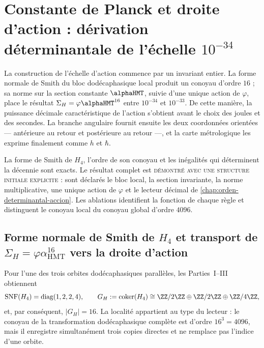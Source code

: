\section{Constante de Planck et droite d'action : dérivation déterminantale de l'échelle \texorpdfstring{\(10^{-34}\)}{décadique -34}}
\label{chap:escala-accion}

La construction de l'échelle d'action commence par un invariant entier. La
forme normale de Smith du bloc dodécaphasique local produit un conoyau
d'ordre \(16\) ; sa norme sur la section constante \(\alphaHMT\), suivie d'une
unique action de \(\varphi\), place le résultat
\(\Sigma_H=\varphi\alphaHMT^{16}\) entre \(10^{-34}\) et \(10^{-33}\). De
cette manière, la puissance décimale caractéristique de l'action s'obtient avant
le choix des joules et des secondes. La branche angulaire fournit ensuite les deux
coordonnées orientées --- antérieure au retour et postérieure au retour ---, et la
carte métrologique les exprime finalement comme \(h\) et \(\hbar\).

\begin{exactbox}[title={Résultat directeur : du conoyau local à l'échelle d'action}]
La forme de Smith de \(H_4\), l'ordre de son conoyau et les inégalités qui
déterminent la décennie sont exacts. Le résultat complet est
\textsc{démontré avec une structure initiale explicite} : sont déclarés le
bloc local, la section invariante, la norme multiplicative, une unique
action de \(\varphi\) et le lecteur décimal de
\cref{chap:orden-determinantal-accion}. Les ablations identifient la fonction
de chaque règle et distinguent le conoyau local du conoyau global d'ordre
\(4096\).
\end{exactbox}

\subsection{Forme normale de Smith de \texorpdfstring{\(H_4\)}{H4} et transport de \texorpdfstring{\(\Sigma_H=\varphi\alpha_{\mathrm{HMT}}^{16}\)}{Sigma H} vers la droite d'action}

Pour l'une des trois orbites dodécaphasiques parallèles, les Parties~I--III obtiennent
\[
\operatorname{SNF}(H_4)=\operatorname{diag}(1,2,2,4),
\qquad
G_H:=\operatorname{coker}(H_4)
\cong\ZZ/2\ZZ\oplus\ZZ/2\ZZ\oplus\ZZ/4\ZZ,
\]
et, par conséquent, \(|G_H|=16\). La localité appartient au type du lecteur : le
conoyau de la transformation dodécaphasique complète est d'ordre
\(16^3=4096\), mais il enregistre simultanément trois copies directes et ne
remplace pas l'indice d'une orbite.

